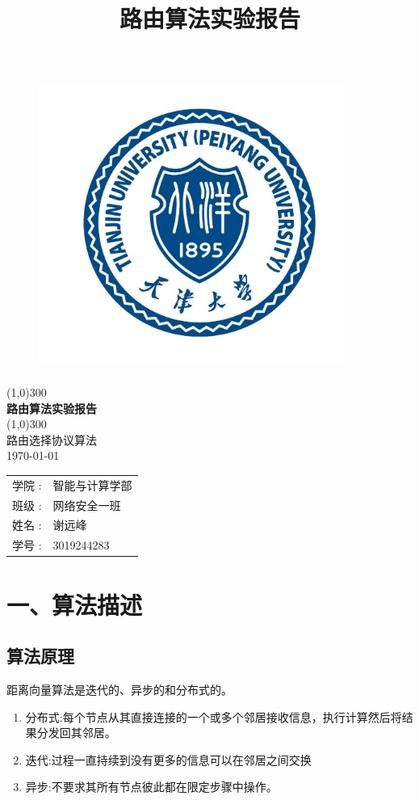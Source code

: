 \documentclass[UTF8,14pt]{article}
\title{路由算法实验报告}
\numberwithin{figure}{section}
\begin{document}
\begin{titlepage}
    \begin{center}
        \begin{figure}[ht]
            \centering
            \includegraphics[width=10cm,height=9.5cm]{封面.png}
        \end{figure}
        \line(1,0){300}\\
        [0.65cm]
        \Huge{\bfseries 路由算法实验报告 }\\
        \line(1,0){300}\\
        \huge {路由选择协议算法\\
            \today}\\
        [3.5cm]
        \LARGE{
            \begin{tabular}{rl}
                学院 :        & 智能与计算学部 \\
                班级 :        & 网络安全一班   \\
                姓名        : & 谢远峰         \\
                学号       :  & 3019244283
            \end{tabular}
        }
    \end{center}

\end{titlepage}
\clearpage

\section{一、算法描述}
\subsection{算法原理}
距离向量算法是迭代的、异步的和分布式的。
\begin{enumerate}
    \setlength{\itemsep}{0pt}
          \setlength{\parsep}{0pt}
          \setlength{\parskip}{0pt}
    \item {\normalsize 分布式}:每个节点从其直接连接的一个或多个邻居接收信息，执行计算然后将结果分发回其邻居。
    \item {\normalsize 迭代}:过程一直持续到没有更多的信息可以在邻居之间交换
    \item {\normalsize 异步}:不要求其所有节点彼此都在限定步骤中操作。
\end{enumerate}
\end{document}
